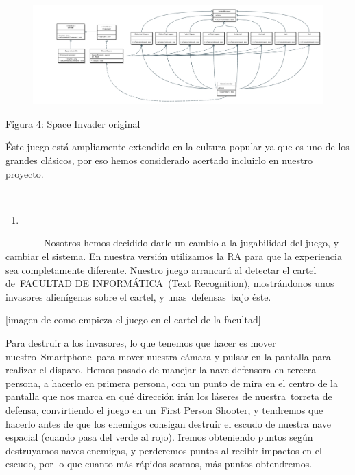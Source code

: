 ~~~~~~~~~~~~~~~~~ ~~~~~~~~~~~~~~~~~

\begin{figure}[htbp]
\centering
\includegraphics{images/image06.png}
\end{figure}

Figura 4: Space Invader original

Éste juego está ampliamente extendido en la cultura popular ya que es
uno de los grandes clásicos, por eso hemos considerado acertado
incluirlo en nuestro proyecto.

~~~~~~~~

\begin{enumerate}
\def\labelenumi{\arabic{enumi}.}
\setcounter{enumi}{1}
\item
\end{enumerate}

~~~~~~~~Nosotros hemos decidido darle un cambio a la jugabilidad del
juego, y cambiar el sistema. En nuestra versión utilizamos la RA para
que la experiencia sea completamente diferente. Nuestro juego arrancará
al detectar el cartel de~FACULTAD DE INFORMÁTICA~(Text Recognition),
mostrándonos unos invasores alienígenas sobre el cartel, y
unas~defensas~bajo éste.

{[}imagen de como empieza el juego en el cartel de la facultad{]}

Para destruir a los invasores, lo que tenemos que hacer es mover
nuestro~Smartphone~para mover nuestra cámara y pulsar en la pantalla
para realizar el disparo. Hemos pasado de manejar la nave defensora en
tercera persona, a hacerlo en primera persona, con un punto de mira en
el centro de la pantalla que nos marca en qué dirección irán los láseres
de nuestra~torreta de defensa, convirtiendo el juego en un~First Person
Shooter, y tendremos que hacerlo antes de que los enemigos consigan
destruir el escudo de nuestra nave espacial (cuando pasa del verde al
rojo). Iremos obteniendo puntos según destruyamos naves enemigas, y
perderemos puntos al recibir impactos en el escudo, por lo que cuanto
más rápidos seamos, más puntos obtendremos.

